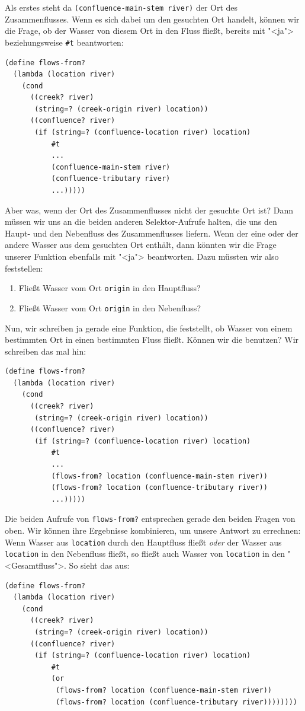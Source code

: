 Als erstes steht da \lstinline{(confluence-main-stem river)} der Ort
des Zusammenflusses.  Wenn es sich dabei um den gesuchten Ort handelt,
können wir die Frage, ob der Wasser von diesem Ort in den Fluss fließt, bereits
mit "<ja"> beziehungsweise \lstinline{#t} beantworten:
%
\begin{lstlisting}
(define flows-from?
  (lambda (location river)
    (cond
      ((creek? river)
       (string=? (creek-origin river) location))
      ((confluence? river)
       (if (string=? (confluence-location river) location)
           #t
           ...
           (confluence-main-stem river)
           (confluence-tributary river)
           ...)))))
\end{lstlisting}
%
Aber was, wenn der Ort des Zusammenflusses nicht der gesuchte Ort ist?
Dann müssen wir uns an die beiden anderen
Selektor-Aufrufe halten, die uns den Haupt- und den Nebenfluss des
Zusammenflusses liefern.  Wenn der eine oder der andere Wasser aus dem
gesuchten Ort enthält, dann könnten wir die Frage unserer Funktion
ebenfalls mit "<ja"> beantworten.  Dazu müssten wir also feststellen:
%
\begin{enumerate}
\item Fließt Wasser vom Ort \lstinline{origin} in den Hauptfluss?
\item Fließt Wasser vom Ort \lstinline{origin} in den Nebenfluss?
\end{enumerate}
%
Nun, wir schreiben ja gerade eine Funktion, die feststellt, ob Wasser
von einem bestimmten Ort in einen bestimmten Fluss fließt.  Können wir
die benutzen?  Wir schreiben das mal hin:
%
\begin{lstlisting}
(define flows-from?
  (lambda (location river)
    (cond
      ((creek? river)
       (string=? (creek-origin river) location))
      ((confluence? river)
       (if (string=? (confluence-location river) location)
           #t
           ...
           (flows-from? location (confluence-main-stem river))
           (flows-from? location (confluence-tributary river))
           ...)))))
\end{lstlisting}
%
Die beiden Aufrufe von \lstinline{flows-from?} entsprechen gerade
den beiden Fragen von oben.  Wir können ihre Ergebnisse kombinieren,
um unsere Antwort zu errechnen: Wenn Wasser aus \lstinline{location}
durch den Hauptfluss fließt \emph{oder} der Wasser aus
\lstinline{location} in den Nebenfluss fließt, so fließt auch Wasser
von \lstinline{location} in den "<Gesamtfluss">.  So sieht das aus:
%
\begin{lstlisting}
(define flows-from?
  (lambda (location river)
    (cond
      ((creek? river)
       (string=? (creek-origin river) location))
      ((confluence? river)
       (if (string=? (confluence-location river) location)
           #t
           (or
            (flows-from? location (confluence-main-stem river))
            (flows-from? location (confluence-tributary river))))))))
\end{lstlisting}
